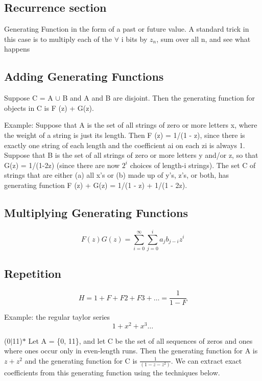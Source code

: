 \documentclass[twoside]{article}
\begin{document}
\subsection{Recurrence section}
Generating Function in the form of a past or future value. A standard trick in this case is to multiply each of the $\forall$ i bits by $z_n$, sum over all n, and see what happens

\subsection{Adding Generating Functions}
Suppose C = A $\cup$ B and A and B are disjoint. Then the generating function for objects in C is F (z) + G(z).

Example: Suppose that A is the set of all strings of zero or more letters x, where the weight of a string is just its length. Then F (z) = 1/(1 - z), since there is exactly one string of each length and the coefficient ai on each zi is always 1. Suppose that B is the set of all strings of zero or more letters y and/or z, so that G(z) = 1/(1-2z) (since there are now $2^i$ choices of length-i strings). The set C of strings that are either (a) all x’s or (b) made up of y’s, z’s, or both, has generating function F (z) + G(z) = 1/(1 - z) + 1/(1 - 2z).
\subsection{Multiplying Generating Functions}
\begin{equation}
F(z)G(z)= \sum_{i=0}^{\infty} \sum_{j=0}^i a_j b_{j-i} z^i
\end{equation}

\subsection{Repetition}
\begin{equation}
H=1+F+F2+F3+\ldots = \frac{1}{1-F}
\end{equation}


Example: the regular taylor series
\begin{equation}
1 + x^2 + x^3 \ldots
\end{equation}

(0$|$11)$*$ Let A = \{0, 11\}, and let C be the set of all sequences of zeros and ones where ones occur only  in even-length runs. Then the generating function for A is $z + z^2$ and the generating function for C is $\frac{1}{(1-z-z^2)}$. We can extract exact coefficients from this generating function using the techniques below.
\end{document}
